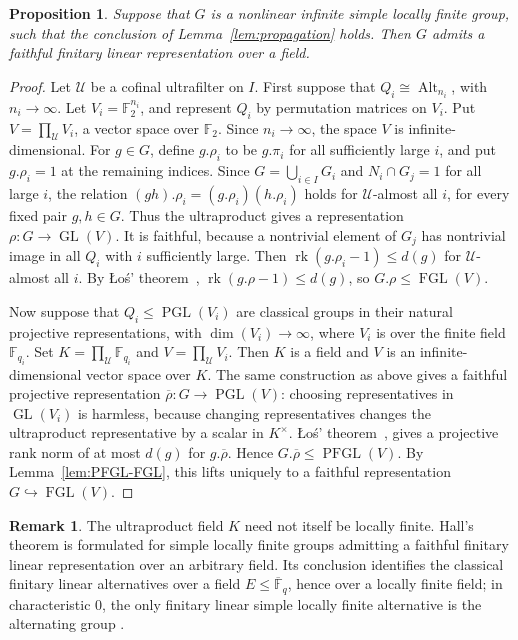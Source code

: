 \documentclass[a4paper,12pt]{amsproc}
\DeclareMathOperator{\rk}{rk}%
\DeclareMathOperator{\Alt}{Alt}%
\DeclareMathOperator{\FGL}{FGL}%
\DeclareMathOperator{\PFGL}{PFGL}%
\theoremstyle{plain}
\newtheorem{proposition}[definition]{Proposition}
\theoremstyle{definition}
\newtheorem{remark}[definition]{Remark}
\begin{document}
\begin{proposition}\label{prop:ultraproduct-finitary}
Suppose that $G$ is a nonlinear infinite simple locally finite group, such
that the conclusion of Lemma~\ref{lem:propagation} holds. Then
$G$ admits a faithful finitary linear representation over a field.
\end{proposition}

\begin{proof}
Let $\mathcal U$ be a cofinal  ultrafilter on $I$. First suppose that $Q_i\cong \Alt_{n_i}$, with $n_i\to\infty$. Let
$V_i=\mathbb F_2^{n_i}$, and represent $Q_i$ by permutation matrices on
$V_i$. Put $V=\prod_{\mathcal U}V_i$, a vector space over
$\mathbb F_2$. Since $n_i\to\infty$, the space $V$ is
infinite-dimensional. For $g\in G$, define $g.\rho_i$ to be $g.\pi_i$ for all sufficiently large $i$, and put $g.\rho_i=1$ at
the remaining indices. Since $G=\bigcup_{i\in I}G_i$ and $N_i\cap G_j=1$ for
all large $i$, the relation $(gh).\rho_i=(g.\rho_i)(h.\rho_i)$ holds for
$\mathcal U$-almost all $i$, for every fixed pair $g,h\in G$. Thus the
ultraproduct gives a representation $\rho\colon G\to\operatorname{GL}(V)$. It is
faithful, because a nontrivial element of $G_j$ has nontrivial image in
all $Q_i$ with $i$ sufficiently large. Then $\rk(g.\rho_i-1)\leq d(g)$ for
$\mathcal U$-almost all $i$. By  {\L}o{\'s}' theorem~\cite{los1955remarques},
$\rk(g.\rho-1)\leq d(g)$, so $G.\rho\leq \FGL(V)$.

Now suppose that $Q_i\leq\operatorname{PGL}(V_i)$ are classical groups in
their natural projective representations, with $\dim(V_i)\to\infty$, where
$V_i$ is over the finite field $\mathbb{F}_{q_i}$. Set
$K=\prod_{\mathcal U}\mathbb{F}_{q_i}$ and $V=\prod_{\mathcal U}V_i$. Then $K$ is a
field and $V$ is an infinite-dimensional vector space over $K$. The same
construction as above gives a faithful projective representation $\overline{\rho}:G\to\operatorname{PGL}(V)$: choosing representatives in
$\operatorname{GL}(V_i)$ is harmless, because changing representatives
changes the ultraproduct representative by a scalar in $K^\times$.  {\L}o{\'s}' theorem~\cite{los1955remarques}, gives a projective rank norm of at most $d(g)$ for $g.\overline{\rho}$. Hence
$G.\overline{\rho}\leq\PFGL(V)$. By Lemma~\ref{lem:PFGL-FGL}, this lifts
uniquely to a faithful representation $G\hookrightarrow\FGL(V)$.
\end{proof}

\begin{remark}
The ultraproduct field $K$ need not itself be locally finite. Hall's theorem is
formulated for simple locally finite groups admitting a faithful finitary
linear representation over an arbitrary field. Its conclusion identifies the
classical finitary linear alternatives over a field $E\leq \overline{\mathbb F}_q$,
hence over a locally finite field; in characteristic $0$, the only
finitary linear simple locally finite alternative is the alternating group
\cite{hall2006periodic}.
\end{remark}
\end{document}
